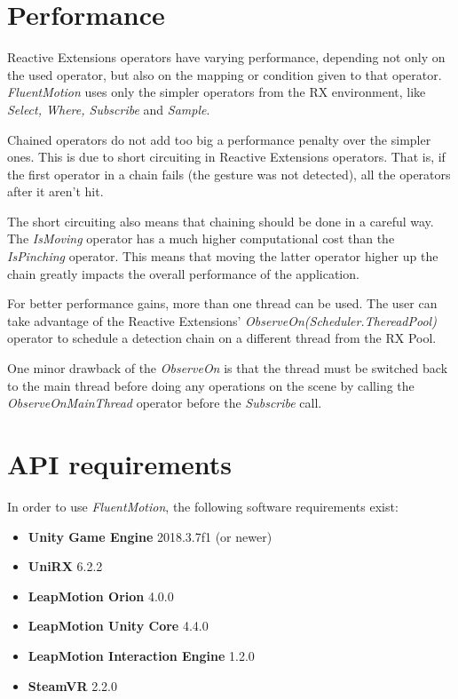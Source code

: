 \documentclass{sigchi}
\def\fluentmotion{\textit{FluentMotion}}
\def\rx{Reactive Extensions}
\begin{document}
\section{Performance}

\rx{} operators have varying performance, depending not only on the used operator, but also on the mapping or condition given to that operator. \fluentmotion{} uses only the simpler operators from the RX environment, like \textit{Select, Where, Subscribe} and \textit{Sample}.

Chained operators do not add too big a performance penalty over the simpler ones. This is due to short circuiting in \rx{} operators. That is, if the first operator in a chain fails (the gesture was not detected), all the operators after it aren't hit.


The short circuiting also means that chaining should be done in a careful way. The \textit{IsMoving} operator has a much higher computational cost than the \textit{IsPinching} operator. This means that moving the latter operator higher up the chain greatly impacts the overall performance of the application.


For better performance gains, more than one thread can be used. The user can take advantage of the \rx{}' \textit{ObserveOn(Scheduler.ThereadPool)} operator to schedule a detection chain on a different thread from the RX Pool. 

One minor drawback of the \textit{ObserveOn} is that the thread must be switched back to the main thread before doing any operations on the scene by calling the \textit{ObserveOnMainThread} operator before the \textit{Subscribe} call.

\section{API requirements}

In order to use \fluentmotion{}, the following software requirements exist:

\begin{itemize}
  \item \textbf{Unity Game Engine} 2018.3.7f1 (or newer)
  \item \textbf{UniRX} 6.2.2
  \item \textbf{LeapMotion Orion} 4.0.0
  \item \textbf{LeapMotion Unity Core} 4.4.0
  \item \textbf{LeapMotion Interaction Engine} 1.2.0
  \item \textbf{SteamVR} 2.2.0 
\end{itemize}
\end{document}
